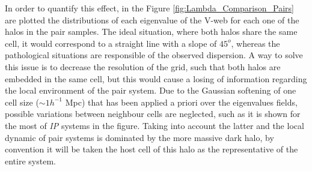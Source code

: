In order to quantify this effect, in the Figure 
\ref{fig:Lambda_Comparison_Pairs} are plotted the distributions of each 
eigenvalue of the V-web for each one of the halos in the pair samples. The
ideal situation, where both halos share the same cell, it would correspond
to a straight line with a slope of $45^o$, whereas the pathological 
situations are responsible of the observed dispersion. A way to solve this 
issue is to decrease the resolution of the grid, such that both halos are 
embedded in the same cell, but this would cause a losing of information 
regarding the local environment of the pair system. Due to the Gaussian 
softening of one cell size ($\sim 1 h^{-1}$ Mpc) that has been applied a 
priori over the eigenvalues fields, possible variations between neighbour
cells are neglected, such as it is shown for the most of \textit{IP} 
systems in the figure. Taking into account the latter and the local 
dynamic of pair systems is dominated by the more massive dark halo, by 
convention it will be taken the host cell of this halo as the 
representative of the entire system.


